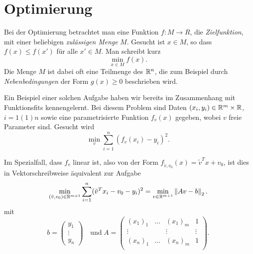 % 

\chapter{Optimierung}

Bei der Optimierung betrachtet man eine Funktion $f:M\to R$, die
\emph{Zielfunktion}, mit einer beliebigen \emph{zulässigen Menge} $M$.
Gesucht ist $x\in M$, so dass $f(x) \le f(x')$ für alle $x'\in M$. Man
schreibt kurz
\begin{equation}
  \label{eq:min}
  \min_{x\in M} f(x).
\end{equation}
Die Menge $M$ ist dabei oft eine Teilmenge des $\mathbb{R}^n$, die zum
Beispiel durch \emph{Nebenbedingungen} der Form $g(x)\ge 0$
beschrieben wird.

Ein Beispiel einer solchen Aufgabe haben wir bereits im Zusammenhang
mit Funktionsfits kennengelernt. Bei diesem Problem sind Daten $(x_i,
y_i)\in\mathbb{R}^m\times\mathbb{R}$, $i=1(1)n$ sowie eine parametrisierte Funktion
$f_v(x)$ gegeben, wobei $v$ freie Parameter sind. Gesucht
wird
\begin{equation}
  \label{eq:fit}
  \min_{v} \sum_{i=1}^n (f_v(x_i) - y_i)^2.
\end{equation}

Im Spezialfall, dass $f_v$ linear ist, also von der Form
$f_{\tilde{v},v_0}(x) = \tilde{v}^Tx + v_0$, ist dies in
Vektorschreibweise äquivalent zur Aufgabe
\begin{equation}
  \label{eq:min2}
  \min_{(\tilde{v},v_0)\in\mathbb{R}^{m+1}} \sum_{i=1}^n (\tilde{v}^Tx_i -
  v_0 - y_i)^2 = \min_{v\in\mathbb{R}^{m+1}} \left\lVert{A v - b}\right\rVert_2.
\end{equation}
mit
\begin{equation*}
  b =
  \begin{pmatrix}
    y_1\\
    \vdots\\
    y_n
  \end{pmatrix}
\quad\text{und}\;
A =
\begin{pmatrix}
  (x_1)_1 & \ldots & (x_1)_m & 1\\
  \vdots &        & \vdots & \vdots\\
  (x_n)_1 & \ldots & (x_n)_m & 1\\
\end{pmatrix}.
\end{equation*}

